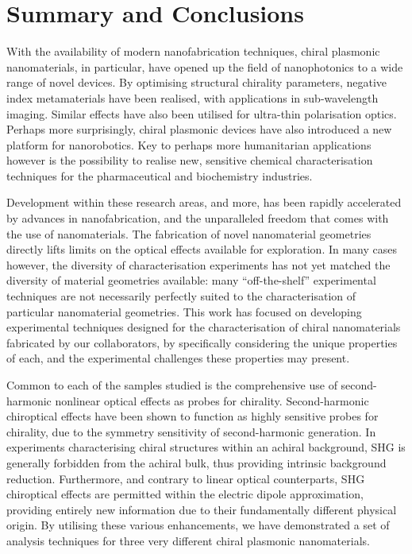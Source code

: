 \chapter{Summary and Conclusions}\label{sec:Conclusions}

With the availability of modern nanofabrication techniques, chiral plasmonic nanomaterials, in particular, have opened up the field of nanophotonics to a wide range of novel devices. By optimising structural chirality parameters, negative index metamaterials have been realised, with applications in sub-wavelength imaging. Similar effects have also been utilised for ultra-thin polarisation optics. Perhaps more surprisingly, chiral plasmonic devices have also introduced a new platform for nanorobotics. Key to perhaps more humanitarian applications however is the possibility to realise new, sensitive chemical characterisation techniques for the pharmaceutical and biochemistry industries. 

Development within these research areas, and more, has been rapidly accelerated by advances in nanofabrication, and the unparalleled freedom that comes with the use of nanomaterials. The fabrication of novel nanomaterial geometries directly lifts limits on the optical effects available for exploration. In many cases however, the diversity of characterisation experiments has not yet matched the diversity of material geometries available: many ``off-the-shelf'' experimental techniques are not necessarily perfectly suited to the characterisation of particular nanomaterial geometries. This work has focused on developing experimental techniques designed for the characterisation of chiral nanomaterials fabricated by our collaborators, by specifically considering the unique properties of each, and the experimental challenges these properties may present. 

Common to each of the samples studied is the comprehensive use of second-harmonic nonlinear optical effects as probes for chirality. Second-harmonic chiroptical effects have been shown to function as highly sensitive probes for chirality, due to the symmetry sensitivity of second-harmonic generation. In experiments characterising chiral structures within an achiral background, SHG is generally forbidden from the achiral bulk, thus providing intrinsic background reduction. Furthermore, and contrary to linear optical counterparts, SHG chiroptical effects are permitted within the electric dipole approximation, providing entirely new information due to their fundamentally different physical origin. By utilising these various enhancements, we have demonstrated a set of analysis techniques for three very different chiral plasmonic nanomaterials.

